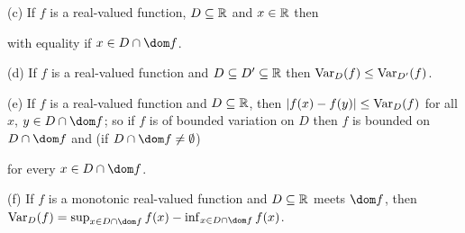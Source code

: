 (c) If $f$ is a real-valued function, $D\subseteq\Bbb R$ and
$x\in \Bbb R$ then


\noindent with equality if $x\in D\cap\dom f$.

(d) If $f$ is a real-valued function and $D\subseteq D'\subseteq\Bbb R$
then $\mathop{\text{Var}}_D(f)\le\mathop{\text{Var}}_{D'}(f)$.

(e) If $f$ is a real-valued function and $D\subseteq\Bbb R$, then
$|f(x)-f(y)|\le\mathop{\text{Var}}_D(f)$ for all $x$, $y\in D\cap\dom f$;  so if $f$ is
of bounded variation on $D$ then $f$ is bounded on $D\cap\dom f$ and (if
$D\cap\dom f\ne\emptyset$)


\noindent for every $x\in D\cap\dom f$.

(f) If $f$ is a monotonic real-valued function and $D\subseteq\Bbb R$
meets $\dom f$, then
\discrcenter{468pt}
{$\Var_D(f)=\sup_{x\in D\cap\dom f}f(x)-\inf_{x\in D\cap\dom f}f(x)$.}


